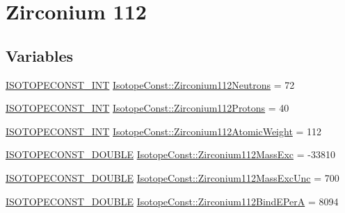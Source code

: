 \hypertarget{group___isotope_const-_zirconium-_zr112}{}\section{Zirconium 112}
\label{group___isotope_const-_zirconium-_zr112}
\subsection*{Variables}
\begin{DoxyCompactItemize}
\item 
\mbox{\hyperlink{group___isotope_const-_macros_ga5f18360b3e99483a35c32d789e62621c}{I\+S\+O\+T\+O\+P\+E\+C\+O\+N\+S\+T\+\_\+\+I\+NT}} \mbox{\hyperlink{group___isotope_const-_zirconium-_zr112_gabb1ec873ef3639c701d2ccb3e5476957}{Isotope\+Const\+::\+Zirconium112\+Neutrons}} = 72
\item 
\mbox{\hyperlink{group___isotope_const-_macros_ga5f18360b3e99483a35c32d789e62621c}{I\+S\+O\+T\+O\+P\+E\+C\+O\+N\+S\+T\+\_\+\+I\+NT}} \mbox{\hyperlink{group___isotope_const-_zirconium-_zr112_gab20ced5cb81567d34d5b2c0f663ac2e9}{Isotope\+Const\+::\+Zirconium112\+Protons}} = 40
\item 
\mbox{\hyperlink{group___isotope_const-_macros_ga5f18360b3e99483a35c32d789e62621c}{I\+S\+O\+T\+O\+P\+E\+C\+O\+N\+S\+T\+\_\+\+I\+NT}} \mbox{\hyperlink{group___isotope_const-_zirconium-_zr112_ga2e64bb3e9a5f39e66849f83c01784b4f}{Isotope\+Const\+::\+Zirconium112\+Atomic\+Weight}} = 112
\item 
\mbox{\hyperlink{group___isotope_const-_macros_ga8f45a7272ce02c0b4c65c44636ed719a}{I\+S\+O\+T\+O\+P\+E\+C\+O\+N\+S\+T\+\_\+\+D\+O\+U\+B\+LE}} \mbox{\hyperlink{group___isotope_const-_zirconium-_zr112_ga89af8ec8f2d17b0e07229762179a338f}{Isotope\+Const\+::\+Zirconium112\+Mass\+Exc}} = -\/33810
\item 
\mbox{\hyperlink{group___isotope_const-_macros_ga8f45a7272ce02c0b4c65c44636ed719a}{I\+S\+O\+T\+O\+P\+E\+C\+O\+N\+S\+T\+\_\+\+D\+O\+U\+B\+LE}} \mbox{\hyperlink{group___isotope_const-_zirconium-_zr112_ga5d879643a835e2233ec8a5bf19625bb5}{Isotope\+Const\+::\+Zirconium112\+Mass\+Exc\+Unc}} = 700
\item 
\mbox{\hyperlink{group___isotope_const-_macros_ga8f45a7272ce02c0b4c65c44636ed719a}{I\+S\+O\+T\+O\+P\+E\+C\+O\+N\+S\+T\+\_\+\+D\+O\+U\+B\+LE}} \mbox{\hyperlink{group___isotope_const-_zirconium-_zr112_ga69f082b73e8369b8a2fb0b5a51cfe5fb}{Isotope\+Const\+::\+Zirconium112\+Bind\+E\+PerA}} = 8094
\item 

\end{DoxyCompactItemize}
